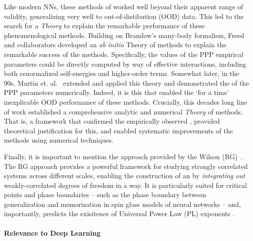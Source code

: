 Like modern NNs, these \SemiEmpirical methods of \QuantumChemistry
worked well beyond their apparent range of validity,
generalizing very well to out-of-distibution (OOD) data.  This led to the
search for a \SemiEmpirical \emph{Theory} to explain the
remarkable performance of these phenomenological methods.
Building on Brandow’s many-body formalism, Freed and collaborators
\cite{freed1977, Freed1983}
developed an \emph{ab initio} \EffectiveHamiltonian
Theory of \SemiEmpirical methods  to explain the remarkable success of the \SemiEmpirical methods.
Specifically, the values of the PPP empirical parameters could be directly computed by way of
effective interactions, including both renormalized self-energies and higher-order terms.
 Somewhat later, in the 90s,
 Martin et. al.~\cite{MartinFreed1996, Martin1996, Martin1996_CPL, Martin1998}
 extended and applied this \EffectiveHamiltonian theory
 and demonstrated the \Universality of the \SemiEmpirical PPP parameters numerically.
 Indeed, it is this \Universality that enabled the `for a time' inexplicable
 OOD performance of these methods.
 Crucially, this decades long line of work established a comprehensive
 analytic and numerical \emph{Theory} of \SemiEmpirical methods.
 That is, a framework that confirmed the empirically observed \Universality,
 provided theoretical justification for this,
 and enabled systematic improvements of the methods using numerical techniques.

 Finally, it is important to mention the \EffectiveHamiltonian approach provided by the Wilson \emph{\RenormalizationGroup}
 (RG)~\cite{NobelPrizeRG,PhysRevLett.69.800}.
 The RG approach provides a powerful framework for studying strongly correlated systems across different scales,
 enabling the construction of an \EffectiveHamiltonian by \emph{integrating out} weakly-correlated degrees of freedom in a \ScaleInvariant way.
 It is particularly suited for critical points and phase boundaries --
 such as the phase boundary between generalization and memorization in spin glass models of neural networks --
 and, importantly,
 predicts the  exisitence of Universal Power Law (PL) exponents .
 
 \paragraph{Relevance to Deep Learning}
 
